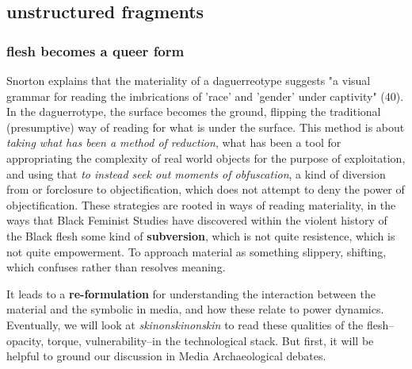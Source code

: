 \documentclass[11pt]{article}
\begin{document}
\subsection{unstructured fragments}
\label{sec:orgf80d4d8}
\subsubsection{flesh becomes a queer form}
\label{sec:org08d9e69}
Snorton explains that the materiality of a daguerreotype suggests "a
visual grammar for reading the imbrications of 'race' and 'gender'
under captivity" (40). In the daguerrotype, the surface becomes the
ground, flipping the traditional (presumptive) way of reading for what
is under the surface. This method is about \emph{taking what has been a
method of reduction}, what has been a tool for appropriating the
complexity of real world objects for the purpose of exploitation, and
using that \emph{to instead seek out moments of obfuscation}, a kind of
diversion from or forclosure to objectification, which does not
attempt to deny the power of objectification. These strategies are
rooted in ways of reading materiality, in the ways that Black Feminist
Studies have discovered within the violent history of the Black flesh
some kind of \textbf{subversion}, which is not quite resistence, which is not
quite empowerment. To approach material as something slippery,
shifting, which confuses rather than resolves meaning.

It leads to a \textbf{re-formulation} for understanding the interaction
between the material and the symbolic in media, and how these relate
to power dynamics. Eventually, we will look at \emph{skinonskinonskin} to
read these qualities of the flesh--opacity, torque, vulnerability--in
the technological stack. But first, it will be helpful to ground our
discussion in Media Archaeological debates.
\end{document}
